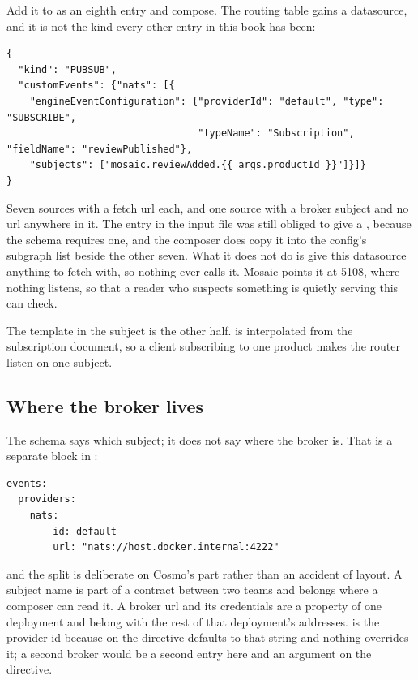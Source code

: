%
Add it to  as an eighth entry and compose. The
routing table gains a datasource, and it is not the kind every other entry in
this book has been:

\begin{verbatim}
{
  "kind": "PUBSUB",
  "customEvents": {"nats": [{
    "engineEventConfiguration": {"providerId": "default", "type": "SUBSCRIBE",
                                 "typeName": "Subscription", "fieldName": "reviewPublished"},
    "subjects": ["mosaic.reviewAdded.{{ args.productId }}"]}]}
}
\end{verbatim}

Seven  sources with a fetch url each, and one 
source with a broker subject and no url anywhere in it. The entry in the input
file was still obliged to give a , because the schema
requires one, and the composer does copy it into the config's subgraph list
beside the other seven. What it does not do is give this datasource anything to
fetch with, so nothing ever calls it. Mosaic points it at 5108, where nothing
listens, so that a reader who suspects something is quietly serving this can
check.

The template in the subject is the other half. 
is interpolated from the subscription document, so a client subscribing to one
product makes the router listen on one subject.

\subsection*{Where the broker lives}

%
The schema says which subject; it does not say where the broker is. That is a
separate block in :

\begin{verbatim}
events:
  providers:
    nats:
      - id: default
        url: "nats://host.docker.internal:4222"
\end{verbatim}

and the split is deliberate on Cosmo's part rather than an accident of
layout. A subject name is part of a contract between two teams and belongs
where a composer can read it. A broker url and its credentials are a property
of one deployment and belong with the rest of that deployment's addresses.
 is the provider id because  on the directive
defaults to that string and nothing overrides it; a second broker would be a
second entry here and an argument on the directive.

